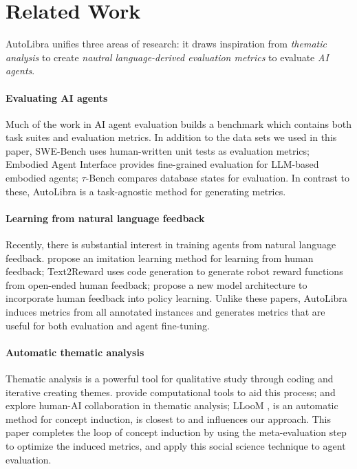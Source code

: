 \section{Related Work}
AutoLibra unifies three areas of research: it draws inspiration from \textit{thematic analysis} to create \textit{nautral language-derived evaluation metrics} to evaluate \textit{AI agents}. 

\paragraph{Evaluating AI agents} Much of the work in AI agent evaluation builds a benchmark which contains both task suites and evaluation metrics. In addition to the data sets we used in this paper, SWE-Bench \citep{jimenezswe} uses human-written unit tests as evaluation metrics; Embodied Agent Interface \citep{li2024embodied} provides fine-grained evaluation for LLM-based embodied agents; $\tau$-Bench \citep{yao2024tau} compares database states for evaluation. In contrast to these, AutoLibra is a task-agnostic method for generating metrics. 

\paragraph{Learning from natural language feedback} Recently, there is substantial interest in training agents from natural language feedback. \citet{chen2024learning} propose an imitation learning method for learning from human feedback; Text2Reward \citep{xietext2reward} uses code generation to generate robot reward functions from open-ended human feedback; \citet{shi2024yell} propose a new model architecture to incorporate human feedback into policy learning. Unlike these papers, AutoLibra induces metrics from all annotated instances and generates metrics that are useful for both evaluation and agent fine-tuning.
\paragraph{Automatic thematic analysis} Thematic analysis is a powerful tool for qualitative study through coding and iterative creating themes. \citet{gauthier2022computational} provide computational tools to aid this process; \citet{hong2022scholastic} and \citet{gebreegziabher2023patat} explore human-AI collaboration in thematic analysis; LLooM \citep{lam2024concept}, is an automatic method for concept induction, is closest to and influences our approach. This paper completes the loop of concept induction by using the meta-evaluation step to optimize the induced metrics, and apply this social science technique to agent evaluation. 